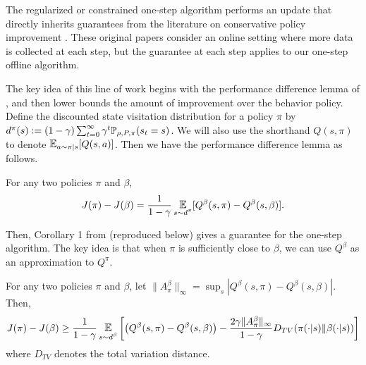 \label{sec:app_improvement}


The regularized or constrained one-step algorithm performs an update that directly inherits guarantees from the literature on conservative policy improvement \citep{kakade2002approximately, schulman2015trust, achiam2017constrained}. These original papers consider an online setting where more data is collected at each step, but the guarantee at each step applies to our one-step offline algorithm.

The key idea of this line of work begins with the performance difference lemma of \cite{kakade2002approximately}, and then lower bounds the amount of improvement over the behavior policy. Define the discounted state visitation distribution for a policy $ \pi$ by $ d^\pi(s) := (1-\gamma) \sum_{t=0}^\infty \gamma^t \mathbb{P}_{\rho, P, \pi}(s_t = s)$. We will also use the shorthand $ Q(s, \pi) $ to denote $ \E_{a\sim\pi|s}[Q(s,a)]$. Then we have the performance difference lemma as follows.

\begin{lemma}
For any two policies $ \pi$ and $ \beta$,
\begin{align}
    J(\pi) - J(\beta) = \frac{1}{1-\gamma} \E_{\substack{s \sim d^\pi}}[ Q^\beta(s,\pi) - Q^\beta(s, \beta)]. %
\end{align}
\end{lemma}

Then, Corollary 1 from \cite{achiam2017constrained} (reproduced below) gives a guarantee for the one-step algorithm. The key idea is that when $ \pi $ is sufficiently close to $ \beta$, we can use $ Q^\beta$ as an approximation to $ Q^\pi$.
\begin{lemma}
For any two policies $ \pi$ and $ \beta$, let $ \|A^\beta_\pi\|_{\infty} = \sup_s  |Q^\beta(s,\pi) - Q^\beta(s, \beta)|$. Then,
    \begin{align}
        J(\pi) - J(\beta) \geq \frac{1}{1-\gamma} \E_{\substack{s \sim d^\beta}}\left[ \left(Q^\beta(s,\pi) - Q^\beta(s, \beta)\right) - \frac{2\gamma \|A^\beta_\pi\|_\infty}{1-\gamma} D_{TV}(\pi(\cdot|s)\|\beta(\cdot|s)) \right]
    \end{align}
where $ D_{TV}$ denotes the total variation distance.
\end{lemma}

